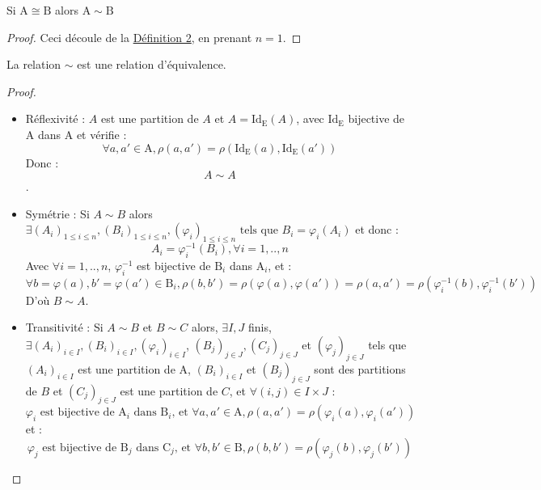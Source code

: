 \begin{PR}
  Si $\mathrm{A} \cong \mathrm{B}$ alors $\mathrm{A} \sim \mathrm{B}$
\end{PR}
\begin{proof}
  Ceci découle de la \hyperref[def3.2]{Définition 2}, en prenant $n = 1$.
\end{proof}
\begin{PR}
  La relation $\sim$ est une relation d'équivalence.
\end{PR}
\begin{proof}
  \hfill
  \begin{itemize}
    \item Réflexivité : $A$ est une partition de $A$ et $A=\mathrm{Id_E}(A)$, avec $\mathrm{Id_E}$ bijective de $\mathrm{A}$ dans $\mathrm{A}$ et vérifie :$$\forall a,a' \in \mathrm{A}, \mathcal{\rho}(a, a') =  \mathcal{\rho}\left(\mathrm{Id_E}\left(a\right), \mathrm{Id_E}\left(a'\right)\right)$$
    Donc :$$A\sim A$$.
    \item Symétrie : Si $A \sim B$ alors $\exists (A_i)_{1 \le i\le n}, (B_i)_{1 \le i\le n}, (\varphi_i)_{1 \le i\le n} \text{ tels que } B_i=\varphi_i(A_i)$ et donc :$$A_i=\varphi_i^{-1}(B_i), \forall i=1,..,n$$
    Avec $\forall i=1,..,n$, $\varphi_i^{-1}$ est bijective de $\mathrm{B}_i$ dans $\mathrm{A}_i$, et :
    $$\forall b=\varphi(a),b'=\varphi(a') \in \mathrm{B}_i, \mathcal{\rho}(b, b') = \mathcal{\rho}(\varphi(a), \varphi(a'))=\mathcal{\rho}(a, a') =\mathcal{\rho}\left(\varphi_i^{-1}\left(b\right), \varphi_i^{-1}\left(b'\right)\right)$$
     D'où  $B \sim A$.
    \item Transitivité : Si $A \sim B$ et $B \sim C$ alors, $\exists I, J$ finis, $\exists (A_i)_{i \in I}, (B_i)_{i \in I}, (\varphi_i)_{i \in I}$, $(B_j)_{j \in J}, (C_j)_{j \in J}$ et $(\varphi_j)_{j \in J}$ tels que $(A_i)_{i \in I}$ est une partition de $\mathrm{A}$, $(B_i)_{i \in I}$ et $(B_j)_{j \in J}$ sont des partitions de $B$ et $(C_j)_{j \in J}$ est une partition de $C$, et $\forall (i,j) \in I \times J$ :
     $$\varphi_i \text{ est bijective de $\mathrm{A}_i$ dans $\mathrm{B}_i$, et } \forall a,a' \in \mathrm{A}, \mathcal{\rho}(a, a') =  \mathcal{\rho}\left(\varphi_i\left(a\right), \varphi_i\left(a'\right)\right)$$
     et :
          $$\varphi_j \text{ est bijective de $\mathrm{B}_j$ dans $\mathrm{C}_j$, et } \forall b,b' \in \mathrm{B}, \mathcal{\rho}(b, b') =  \mathcal{\rho}\left(\varphi_j\left(b\right), \varphi_j\left(b'\right)\right)$$


\end{itemize}
\end{proof}
